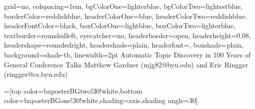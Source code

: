 \documentclass[landscape,final]{baposter}
\begin{document}

\begin{poster}{
  grid=no,
  colspacing=1em,
  bgColorOne=lighterblue,
  bgColorTwo=lightestblue,
  borderColor=reddishblue,
  headerColorOne=blue,
  headerColorTwo=reddishblue,
  headerFontColor=black,
  boxColorOne=lightblue,
  boxColorTwo=lighterblue,
  textborder=roundedleft,
  eyecatcher=no,
  headerborder=open,
  headerheight=0.08\textheight,
  headershape=roundedright,
  headershade=plain,
  headerfont=\Large\textsf, %
  boxshade=plain,
  background=shade-tb,
  linewidth=2pt
  }
  {} %
  {\sf %
  Automatic Topic Discovery in 100 Years of General Conference Talks}
  {\sf %
  Matthew Gardner
  (mjg82@byu.edu)
  and
  Eric Ringger
  (ringger@cs.byu.edu)
  }
  {{\begin{minipage}{16em}
    \hfill
  \end{minipage}}
  }

  =[top color=baposterBGtwo!30!white,bottom color=baposterBGone!30!white,shading=axis,shading angle=30]

     \newlength{\leftimgwidth}
     \setlength{\leftimgwidth}{0.78em+8.0em}

    \newcommand{\colouredcircle}[1]{%
      \tikz{\useasboundingbox (-0.2em,-0.32em) rectangle(0.2em,0.32em); \draw[draw=black,fill=baposterBGone!80!black!#1!white,line width=0.03em] (0,0) circle(0.18em);}}


\end{poster}
\end{document}
